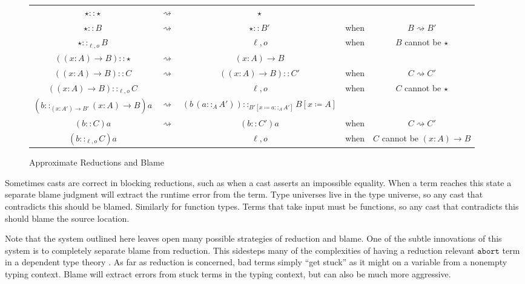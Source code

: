 \begin{sidewaysfigure}
\begin{tabular}{ccccc}
$\star::\star$ & $\rightsquigarrow$ & $\star$ &  & \tabularnewline
$\star::B$ & $\rightsquigarrow$ & $\star::B'$ & when  & $B\rightsquigarrow B'$\tabularnewline
$\star::_{\ell,o}B$ & \Blame{} & $\ell,o$ & when  & $B$ cannot be $\star$ \tabularnewline
$\left(\left(x:A\right)\rightarrow B\right)::\star$ & $\rightsquigarrow$ & $\left(x:A\right)\rightarrow B$ &  & \tabularnewline
$\left(\left(x:A\right)\rightarrow B\right)::C$ & $\rightsquigarrow$ & $\left(\left(x:A\right)\rightarrow B\right)::C'$ & when  & $C\rightsquigarrow C'$\tabularnewline
$\left(\left(x:A\right)\rightarrow B\right)::_{\ell,o}C$ & \Blame{} & $\ell,o$ & when  & $C$ cannot be $\star$ \tabularnewline
$\left(b::_{\left(x:A'\right)\rightarrow B'}\left(x:A\right)\rightarrow B\right)a$ & $\rightsquigarrow$ & $\left(b\,\left(a::_{A} A'\right)\right)::_{B'\left[x\coloneqq a::_{A} A'\right]}B\left[x\coloneqq A\right]$ &  & \tabularnewline
$\left(b::C\right)a$ & $\rightsquigarrow$ & $\left(b::C'\right)a$ & when  & $C\rightsquigarrow C'$\tabularnewline
$\left(b::_{\ell,o}C\right)a$ & \Blame{} & $\ell,o$ & when  & $C$ cannot be $\left(x:A\right)\rightarrow B$ \tabularnewline
\end{tabular}

\caption{Approximate \CLang{} Reductions and Blame}
\label{fig:cast-aprox-red}
\end{sidewaysfigure}

Sometimes casts are correct in blocking reductions, such as when a cast asserts an impossible equality.
When a term reaches this state a separate blame judgment will extract the runtime error from the term.
Type universes live in the type universe, so any cast that contradicts this should be blamed.
Similarly for function types.
Terms that take input must be functions, so any cast that contradicts this should blame the source location.

Note that the system outlined here leaves open many possible strategies of reduction and blame.
One of the subtle innovations of this system is to completely separate blame from reduction.
This sidesteps many of the complexities of having a reduction relevant $\mathtt{abort}$ term in a dependent type theory \cite{sjoberg2012irrelevance,pedrot2018failure}.
As far as reduction is concerned, bad terms simply ``get stuck'' as it might on a variable from a nonempty typing context.
Blame will extract errors from stuck terms in the typing context, but can also be much more aggressive. 

